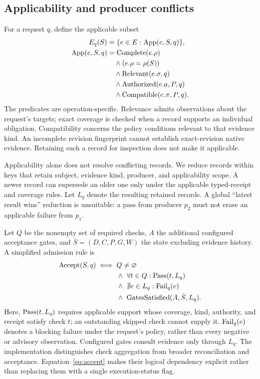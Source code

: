 \subsection{Applicability and producer conflicts}
For a request $q$, define the applicable subset
\begin{align}
 E_q(S)&=\{e\in E:\operatorname{App}(e,S,q)\},\\
 \operatorname{App}(e,S,q)&=\operatorname{Complete}(e.\rho) \nonumber\\
 &\quad\land(e.\rho=\rho(S)) \nonumber\\
 &\quad\land\operatorname{Relevant}(e.\sigma,q) \nonumber\\
 &\quad\land\operatorname{Authorized}(e.a,P,q) \nonumber\\
 &\quad\land\operatorname{Compatible}(e.\pi,P,q).
 \label{eq:applicable}
\end{align}
The predicates are operation-specific. Relevance admits observations about the request's targets; exact coverage is checked when a record supports an individual obligation. Compatibility concerns the policy conditions relevant to that evidence kind. An incomplete revision fingerprint cannot establish exact-revision native evidence. Retaining such a record for inspection does not make it applicable.

Applicability alone does not resolve conflicting records. We reduce records within keys that retain subject, evidence kind, producer, and applicability scope. A newer record can supersede an older one only under the applicable typed-receipt and coverage rules. Let $L_q$ denote the resulting retained records. A global ``latest result wins'' reduction is unsuitable: a pass from producer $p_2$ must not erase an applicable failure from $p_1$.

Let $Q$ be the nonempty set of required checks, $A$ the additional configured acceptance gates, and $\bar S=(D,C,P,G,W)$ the state excluding evidence history. A simplified admission rule is
\begin{align}
 \operatorname{Accept}(S,q) \iff{}& Q\ne\varnothing \nonumber\\
 &\land\ \forall t\in Q:\operatorname{Pass}(t,L_q) \nonumber\\
 &\land\ \nexists e\in L_q:\operatorname{Fail}_q(e) \nonumber\\
 &\land\ \operatorname{GatesSatisfied}(A,\bar S,L_q).
 \label{eq:accept}
\end{align}
Here, $\operatorname{Pass}(t,L_q)$ requires applicable support whose coverage, kind, authority, and receipt satisfy check $t$; an outstanding skipped check cannot supply it. $\operatorname{Fail}_q(e)$ denotes a blocking failure under the request's policy, rather than every negative or advisory observation. Configured gates consult evidence only through $L_q$. The implementation distinguishes check aggregation from broader reconciliation and acceptance. Equation~\eqref{eq:accept} makes their logical dependency explicit rather than replacing them with a single execution-status flag.


